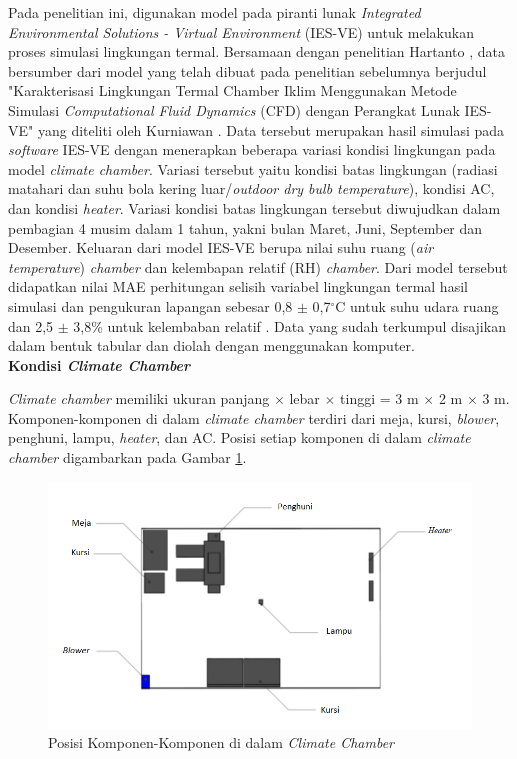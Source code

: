 Pada penelitian ini, digunakan model pada piranti lunak \textit{Integrated Environmental Solutions - Virtual Environment} (IES-VE) untuk melakukan proses simulasi lingkungan termal. Bersamaan dengan penelitian Hartanto \cite{skripsiTanto}, data bersumber dari model yang telah dibuat pada penelitian sebelumnya berjudul "Karakterisasi Lingkungan Termal Chamber Iklim Menggunakan Metode Simulasi \textit{Computational Fluid Dynamics} (CFD) dengan Perangkat Lunak IES-VE" yang diteliti oleh Kurniawan \cite{skripsiIchfan}.  Data tersebut merupakan hasil simulasi pada \textit{software} IES-VE dengan menerapkan beberapa variasi kondisi lingkungan pada model \textit{climate chamber}. Variasi tersebut yaitu kondisi batas lingkungan (radiasi matahari dan suhu bola kering luar/\textit{outdoor dry bulb temperature}), kondisi AC, dan kondisi \textit{heater}. Variasi kondisi batas lingkungan tersebut diwujudkan dalam pembagian 4 musim dalam 1 tahun, yakni bulan Maret, Juni, September dan Desember. Keluaran dari model IES-VE berupa nilai suhu ruang (\textit{air temperature}) \textit{chamber} dan kelembapan relatif (RH) \textit{chamber}. Dari model tersebut didapatkan nilai MAE perhitungan selisih variabel lingkungan termal hasil simulasi dan pengukuran lapangan sebesar 0,8 $\pm$ 0,7$^{\circ}$C untuk suhu udara ruang dan 2,5 $\pm$ 3,8\% untuk kelembaban relatif \cite{skripsiIchfan}. Data yang sudah terkumpul disajikan dalam bentuk tabular dan diolah dengan menggunakan komputer.\\

\noindent\textbf{Kondisi \textit{Climate Chamber}}

\textit{Climate chamber} memiliki ukuran panjang $\times$ lebar $\times$ tinggi = 3 m $\times$ 2 m $\times$ 3 m. Komponen-komponen di dalam \textit{climate chamber} terdiri dari meja, kursi, \textit{blower}, penghuni, lampu, \textit{heater}, dan AC. Posisi setiap komponen di dalam \textit{climate chamber} digambarkan pada Gambar \ref{fig:4:KondisiChamber}.

\begin{figure}[!h]
	\centering
	\includegraphics[width=1\textwidth]{figures/KondisiChamber}
	\caption{Posisi Komponen-Komponen di dalam \textit{Climate Chamber} \cite{skripsiIchfan}}
	\label{fig:4:KondisiChamber}
\end{figure}

